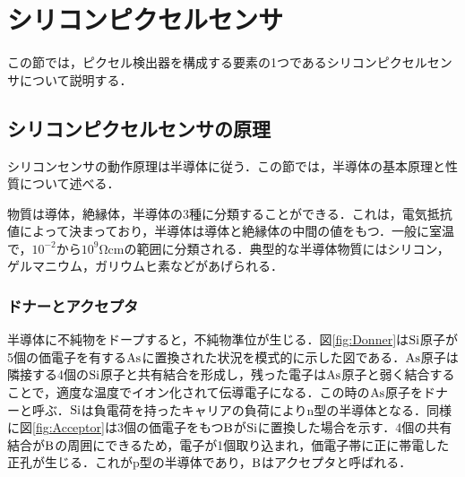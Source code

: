 \section{シリコンピクセルセンサ}
\label{sec:sensor}
この節では，ピクセル検出器を構成する要素の1つであるシリコンピクセルセンサについて説明する．

\subsection{シリコンピクセルセンサの原理}
シリコンセンサの動作原理は半導体に従う．この節では，半導体の基本原理と性質について述べる．\par
物質は導体，絶縁体，半導体の3種に分類することができる．これは，電気抵抗値によって決まっており，半導体は導体と絶縁体の中間の値をもつ．一般に室温で，$10^{-2}$から$10^9 \mathrm{\Omega cm}$の範囲に分類される．典型的な半導体物質にはシリコン，ゲルマニウム，ガリウムヒ素などがあげられる．

\subsubsection*{ドナーとアクセプタ}
半導体に不純物をドープすると，不純物準位が生じる．図\ref{fig:Donner}は$\ce{Si}$原子が5個の価電子を有する$\ce{As}$に置換された状況を模式的に示した図である．$\ce{As}$原子は隣接する4個の$\ce{Si}$原子と共有結合を形成し，残った電子は$\ce{As}$原子と弱く結合することで，適度な温度でイオン化されて伝導電子になる．この時の$\ce{As}$原子をドナーと呼ぶ．$\ce{Si}$は負電荷を持ったキャリアの負荷によりn型の半導体となる．同様に図\ref{fig:Acceptor}は3個の価電子をもつ$\ce{B}$が$\ce{Si}$に置換した場合を示す．4個の共有結合が$\ce{B}$の周囲にできるため，電子が1個取り込まれ，価電子帯に正に帯電した正孔が生じる．これがp型の半導体であり，$\ce{B}$はアクセプタと呼ばれる．

